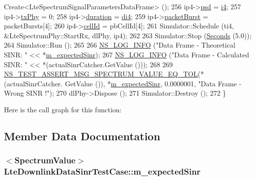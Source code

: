 \begin{DoxyCode}
      Create<LteSpectrumSignalParametersDataFrame> ();
256   ip4->\hyperlink{structns3_1_1SpectrumSignalParameters_afc3b87e914306b069232fda861836051}{psd} = \hyperlink{generate__test__data__lte__sinr_8m_a608e2266a7f74d5814905a52df1fc084}{i4};
257   ip4->\hyperlink{structns3_1_1SpectrumSignalParameters_ab20434042353cbd479e1f9d807f9e37d}{txPhy} = 0;
258   ip4->\hyperlink{structns3_1_1SpectrumSignalParameters_aa97149751dce62c95f523622fd5fbfd3}{duration} = \hyperlink{generate__test__data__lte__sinr_8m_a3786cf5a792e021b7a990bce26931073}{di4};
259   ip4->\hyperlink{structns3_1_1LteSpectrumSignalParametersDataFrame_add8e31df8ae232dec2558cbb733c311e}{packetBurst} = packetBursts[4];
260   ip4->\hyperlink{structns3_1_1LteSpectrumSignalParametersDataFrame_aed33b300ea4ff7a70f6d42c9ea2226ea}{cellId} = pbCellId[4];
261   Simulator::Schedule (ti4, &LteSpectrumPhy::StartRx, dlPhy, ip4);
262 
263   Simulator::Stop (\hyperlink{group__timecivil_ga33c34b816f8ff6628e33d5c8e9713b9e}{Seconds} (5.0));
264   Simulator::Run ();
265 
266   \hyperlink{group__logging_gafbd73ee2cf9f26b319f49086d8e860fb}{NS\_LOG\_INFO} (\textcolor{stringliteral}{"Data Frame - Theoretical SINR: "} << *\hyperlink{classLteDownlinkDataSinrTestCase_a6c43322f73d1561591fcb4380f7ef49c}{m\_expectedSinr});
267   \hyperlink{group__logging_gafbd73ee2cf9f26b319f49086d8e860fb}{NS\_LOG\_INFO} (\textcolor{stringliteral}{"Data Frame - Calculated SINR: "} << *(actualSinrCatcher.GetValue ()));
268  
269   \hyperlink{spectrum-test_8h_ac37d86c7027e04c671885b0f087ab7e0}{NS\_TEST\_ASSERT\_MSG\_SPECTRUM\_VALUE\_EQ\_TOL}(*(actualSinrCatcher.
      GetValue ()), *\hyperlink{classLteDownlinkDataSinrTestCase_a6c43322f73d1561591fcb4380f7ef49c}{m\_expectedSinr}, 0.0000001, \textcolor{stringliteral}{"Data Frame - Wrong SINR !"});
270   dlPhy->Dispose ();
271   Simulator::Destroy ();
272 \}
\end{DoxyCode}


Here is the call graph for this function\+:




\subsection{Member Data Documentation}
\subsubsection[{\texorpdfstring{m\+\_\+expected\+Sinr}{m_expectedSinr}}]{$<${\bf Spectrum\+Value}$>$ Lte\+Downlink\+Data\+Sinr\+Test\+Case\+::m\+\_\+expected\+Sinr\hspace{0.3cm}{\ttfamily [private]}}\hypertarget{classLteDownlinkDataSinrTestCase_a6c43322f73d1561591fcb4380f7ef49c}{}\label{classLteDownlinkDataSinrTestCase_a6c43322f73d1561591fcb4380f7ef49c}
